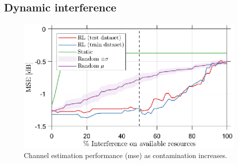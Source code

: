 \subsection{Dynamic interference}\label{subsec:RL_results_B}
\begin{figure}
    \centering
    \includegraphics{chapters/part_uplink/figures/results/MSE_Interference.eps}
    \caption{Channel estimation performance (\gls{mse}) as contamination increases.}
    \label{fig:RL_MSE_Interference}
\end{figure}



